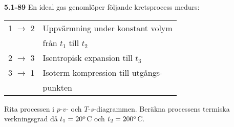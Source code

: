 \documentclass[./exercises.tex]{subfiles}
\begin{document}
\begin{multicols}{2}
\noindent\textbf{5.1-89}\hfill\break
\noindent En ideal gas genomlöper följande kretsprocess medurs:\hfil\par
\noindent\begin{tabular}{ l l  } 
1 $\rightarrow$ 2 & Uppvärmning under konstant volym\\
                  & från $t_1$ till $t_2$  \\ 
2 $\rightarrow$ 3 & Isentropisk expansion till $t_3$  \\ 
3 $\rightarrow$ 1 & Isoterm kompression till utgångs-\\
                  &punkten \\ 
\end{tabular}


Rita processen i $p$-$v$- och $T$-$s$-diagrammen. Beräkna processens termiska
verkningsgrad då $t_1=20^{\rm{o}}$C och $t_2=200^{\rm{o}}$C.

\bigskip


\end{multicols}
\end{document}
